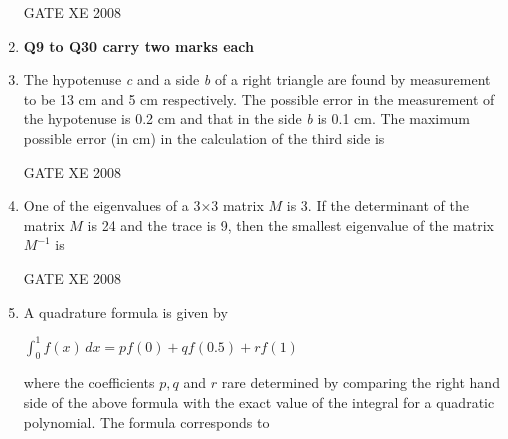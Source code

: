 \documentclass[12pt]{article}
\begin{document}
\begin{enumerate}
\begin{enumerate}
\end{enumerate}

GATE XE 2008

\item []\textbf{Q9 to Q30 carry two marks each}
\item  The hypotenuse \textit{c} and a side \textit{b} of a right triangle are found by measurement to be 13 cm and 5 cm respectively. The possible error in the measurement of the hypotenuse is 0.2 cm and that in the side \textit{b} is 0.1 cm. The maximum possible error (in cm) in the calculation of the third side is

\begin{enumerate}
\end{enumerate}

GATE XE 2008
\item One of the eigenvalues of a 3×3 matrix $M$ is 3. If the determinant of the matrix $M$ is 24 and the trace is 9, then the smallest eigenvalue of the matrix $M^{-1}$ is

\begin{enumerate}
\end{enumerate}

GATE XE 2008
\item  A quadrature formula is given by\begin{center} $\int_{0}^{1} f(x) \,dx =pf(0) + qf(0.5) +rf(1)$\end{center} where the coefficients $p,q$ and $r$ rare determined by comparing the right hand side of the above formula with the exact value of the integral for a quadratic polynomial. The formula corresponds to


\end{enumerate}
\end{document}
